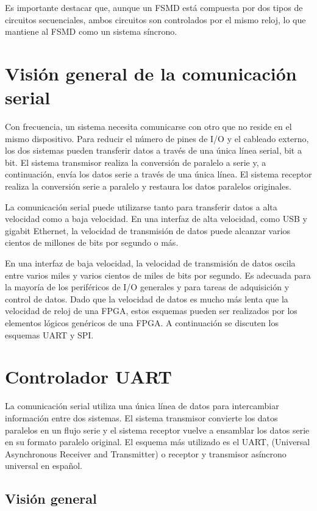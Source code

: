     Es importante destacar que, aunque un FSMD está compuesta por dos tipos de circuitos secuenciales, ambos circuitos son controlados por el mismo reloj, lo que mantiene al FSMD como un sistema síncrono.

  \section{Visión general de la comunicación serial}

    Con frecuencia, un sistema necesita comunicarse con otro que no reside en el mismo dispositivo. Para reducir el número de pines de I/O y el cableado externo, los dos sistemas pueden transferir datos a través de una única línea serial, bit a bit. El sistema transmisor realiza la conversión de paralelo a serie y, a continuación, envía los datos serie a través de una única línea. El sistema receptor realiza la conversión serie a paralelo y restaura los datos paralelos originales.

    La comunicación serial puede utilizarse tanto para transferir datos a alta velocidad como a baja velocidad. En una interfaz de alta velocidad, como USB y gigabit Ethernet, la velocidad de transmisión de datos puede alcanzar varios cientos de millones de bits por segundo o más. 

    En una interfaz de baja velocidad, la velocidad de transmisión de datos oscila entre varios miles y varios cientos de miles de bits por segundo. Es adecuada para la mayoría de los periféricos de I/O generales y para tareas de adquisición y control de datos. Dado que la velocidad de datos es mucho más lenta que la velocidad de reloj de una FPGA, estos esquemas pueden ser realizados por los elementos lógicos genéricos de una FPGA. A continuación se discuten los esquemas UART y SPI.

	\section{Controlador UART}

    La comunicación serial utiliza una única línea de datos para intercambiar información entre dos sistemas. El sistema transmisor convierte los datos paralelos en un flujo serie y el sistema receptor vuelve a ensamblar los datos serie en su formato paralelo original. El esquema más utilizado es el UART, (Universal Asynchronous Receiver and Transmitter) o receptor y transmisor asíncrono universal en español.

    \subsection{Visión general}

